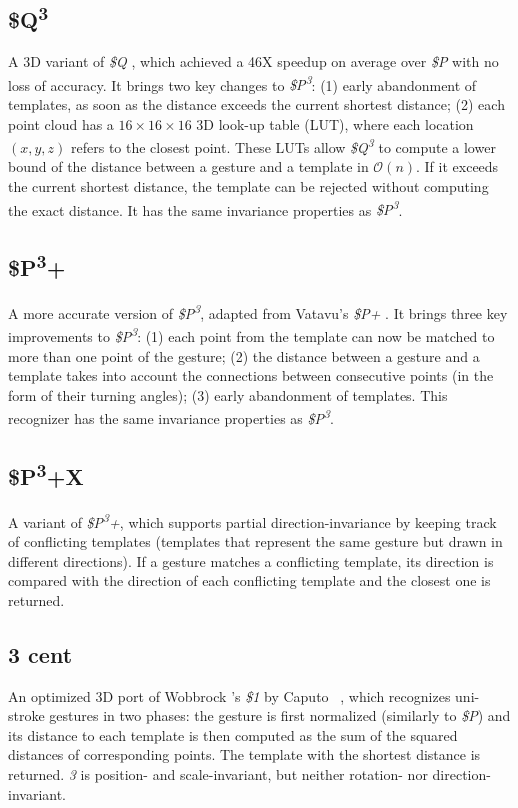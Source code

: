 \subsection{\$Q\texorpdfstring{\textsuperscript{3}}{3}}
A 3D variant of \textit{\$Q} \cite{Vatavu:2018}, which achieved a 46X speedup on average over \textit{\$P} with no loss of accuracy. It brings two key changes to \textit{\$P\textsuperscript{3}}: (1) early abandonment of templates, as soon as the distance exceeds the current shortest distance; (2) each point cloud has a $16{\times}16{\times}16$ 3D look-up table (LUT), where each location $(x, y, z)$ refers to the closest point. These LUTs allow \textit{\$Q\textsuperscript{3}} to compute a lower bound of the distance between a gesture and a template in $\mathcal{O}(n)$. If it exceeds the current shortest distance, the template can be rejected without computing the exact distance. It has the same invariance properties as \textit{\$P\textsuperscript{3}}.
    
\subsection{\$P\texorpdfstring{\textsuperscript{3}}{3}+}
A more accurate version of \textit{\$P\textsuperscript{3}}, adapted from Vatavu's \textit{\$P+} \cite{Vatavu:2017a}. It brings three key improvements to \textit{\$P\textsuperscript{3}}: (1) each point from the template can now be matched to more than one point of the gesture; (2) the distance between a gesture and a template takes into account the connections between consecutive points (in the form of their turning angles); (3) early abandonment of templates. This recognizer has the same invariance properties as \textit{\$P\textsuperscript{3}}.

\subsection{\$P\texorpdfstring{\textsuperscript{3}}{3}+X}
A variant of \textit{\$P\textsuperscript{3}+}, which supports partial direction-invariance by keeping track of conflicting templates (\ie templates that represent the same gesture but drawn in different directions). If a gesture matches a conflicting template, its direction is compared with the direction of each conflicting template and the closest one is returned.

\subsection{3 cent}
An optimized 3D port of Wobbrock \etal's \textit{\$1} \cite{Wobbrock:2007} by Caputo \etal~\cite{Caputo:2017}, which recognizes uni-stroke gestures in two phases: the gesture is first normalized (similarly to \textit{\$P}) and its distance to each template is then computed as the sum of the squared distances of corresponding points. The template with the shortest distance is returned. \textit{3\textcent} is position- and scale-invariant, but neither rotation- nor direction-invariant. 

